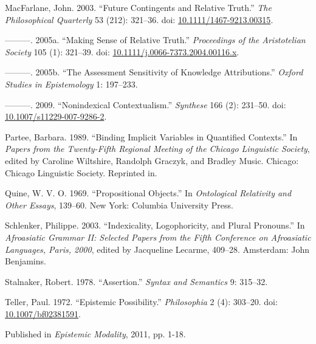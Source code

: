 \documentclass[
  10pt,
  letterpaper,
  DIV=11,
  numbers=noendperiod,
  twoside]{scrartcl}
\newlength{\cslhangindent}
\newenvironment{CSLReferences}[2] %
 {\begin{list}{}{%
  \setlength{\itemindent}{0pt}
  \setlength{\leftmargin}{0pt}
  \setlength{\parsep}{0pt}
  \ifodd #1
   \setlength{\leftmargin}{\cslhangindent}
   \setlength{\itemindent}{-1\cslhangindent}
  \fi
  \setlength{\itemsep}{#2\baselineskip}}}
 {\end{list}}
\begin{document}
\begin{CSLReferences}{1}{0}
MacFarlane, John. 2003. {``Future Contingents and Relative Truth.''}
\emph{The Philosophical Quarterly} 53 (212): 321--36. doi:
\href{https://doi.org/10.1111/1467-9213.00315}{10.1111/1467-9213.00315}.

---------. 2005a. {``{Making Sense of Relative Truth}.''}
\emph{Proceedings of the Aristotelian Society} 105 (1): 321--39. doi:
\href{https://doi.org/10.1111/j.0066-7373.2004.00116.x}{10.1111/j.0066-7373.2004.00116.x}.

---------. 2005b. {``The Assessment Sensitivity of Knowledge
Attributions.''} \emph{Oxford Studies in Epistemology} 1: 197--233.

---------. 2009. {``{Nonindexical Contextualism}.''} \emph{Synthese} 166
(2): 231--50. doi:
\href{https://doi.org/10.1007/s11229-007-9286-2}{10.1007/s11229-007-9286-2}.

Partee, Barbara. 1989. {``Binding Implicit Variables in Quantified
Contexts.''} In \emph{Papers from the Twenty-Fifth Regional Meeting of
the Chicago Linguistic Society}, edited by Caroline Wiltshire, Randolph
Graczyk, and Bradley Music. Chicago: Chicago Linguistic Society.
Reprinted in\cite{Partee2004}.

Quine, W. V. O. 1969. {``Propositional Objects.''} In \emph{Ontological
Relativity and Other Essays}, 139--60. New York: Columbia University
Press.

Schlenker, Philippe. 2003. {``Indexicality, Logophoricity, and Plural
Pronouns.''} In \emph{Afroasiatic Grammar II: Selected Papers from the
Fifth Conference on Afroasiatic Languages, Paris, 2000}, edited by
Jacqueline Lecarme, 409--28. Amsterdam: John Benjamins.

Stalnaker, Robert. 1978. {``Assertion.''} \emph{Syntax and Semantics} 9:
315--32.

Teller, Paul. 1972. {``Epistemic Possibility.''} \emph{Philosophia} 2
(4): 303--20. doi:
\href{https://doi.org/10.1007/bf02381591}{10.1007/bf02381591}.

\end{CSLReferences}



\noindent Published in\emph{
Epistemic Modality}, 2011, pp. 1-18.
\end{document}
